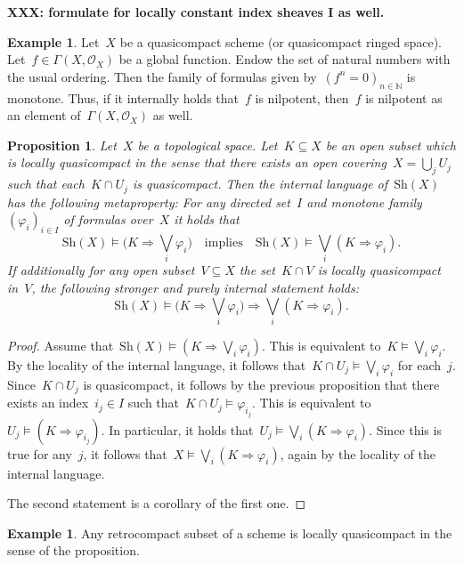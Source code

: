 \documentclass[10pt]{amsart}
\theoremstyle{definition}
\newtheorem{ex}[defn]{Example}
\theoremstyle{plain}
\newtheorem{prop}[defn]{Proposition}
\theoremstyle{remark}
\renewcommand{\O}{\mathcal{O}}
\newcommand{\NN}{\mathbb{N}}
\newcommand{\Sh}{\mathrm{Sh}}
\newcommand{\?}{\,{:}\,}
\renewcommand{\_}{\mathpunct{.}\,}
\newcommand{\XXX}[1]{\textbf{XXX: #1}}
\begin{document}
\XXX{formulate for locally constant index sheaves I as well.}

\begin{ex}\label{ex:nilpotency-directed}
Let~$X$ be a quasicompact scheme (or quasicompact ringed space).
Let~$f \in \Gamma(X,\O_X)$ be a global function. Endow the set of natural
numbers with the usual ordering. Then the family of formulas given by~$(f^n =
0)_{n \in \NN}$ is monotone. Thus, if it internally holds that~$f$ is
nilpotent, then~$f$ is nilpotent as an element of~$\Gamma(X,\O_X)$ as
well.\end{ex}

\begin{prop}Let~$X$ be a topological space. Let~$K \subseteq X$ be an open
subset which is \emph{locally quasicompact} in the sense that there exists an open
covering~$X = \bigcup_j U_j$ such that each~$K \cap U_j$ is quasicompact. Then the
internal language of~$\Sh(X)$ has the following metaproperty: For any
directed set~$I$ and monotone family~$(\varphi_i)_{i \in I}$ of formulas
over~$X$ it holds that
\[ \Sh(X) \models \bigl(K \Rightarrow \bigvee_i \varphi_i\bigr)
  \quad\text{implies}\quad
  \Sh(X) \models \bigvee_i (K \Rightarrow \varphi_i). \]
If additionally for any open subset~$V \subseteq X$ the set~$K \cap V$ is
locally quasicompact in~$V$, the following stronger and purely internal
statement holds:
\[ \Sh(X) \models \bigl(K \Rightarrow \bigvee_i \varphi_i\bigr)
  \Longrightarrow
  \bigvee_i (K \Rightarrow \varphi_i). \]
\end{prop}
\begin{proof}Assume that~$\Sh(X) \models (K \Rightarrow \bigvee_i \varphi_i)$.
This is equivalent to~$K \models \bigvee_i \varphi_i$. By the locality of the
internal language, it follows that~$K \cap U_j \models \bigvee_i \varphi_i$ for each~$j$.
Since~$K \cap U_j$ is quasicompact, it follows by the previous proposition that
there exists an index~$i_j \in I$ such that~$K \cap U_j \models \varphi_{i_j}$.
This is equivalent to~$U_j \models (K \Rightarrow \varphi_{i_j})$. In
particular, it holds that~$U_j \models \bigvee_i (K \Rightarrow \varphi_i)$.
Since this is true for any~$j$, it follows that~$X \models \bigvee_i (K
\Rightarrow \varphi_i)$, again by the locality of the internal language.

The second statement is a corollary of the first one.
\end{proof}

\begin{ex}Any retrocompact subset of a scheme is locally quasicompact in the
sense of the proposition.\end{ex}
\end{document}
